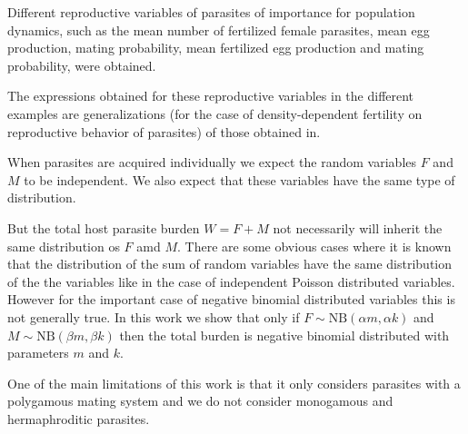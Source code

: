 \documentclass[12pt,a4paper]{article}
\theoremstyle{plain}%
\theoremstyle{definition}
\theoremstyle{remark}
\begin{document}
Different reproductive variables of parasites of importance for population dynamics, such as the mean number of fertilized female parasites, mean egg production, mating probability, mean fertilized egg production and mating probability, were obtained. 
	
The  expressions obtained for these reproductive variables in the different examples are generalizations (for the case of density-dependent fertility on reproductive behavior of parasites) of those obtained in\citep{leyton1968stochastic,may1993biased,may1977togetherness}.



When parasites are acquired individually we expect the random variables $F$ and $M$ to be independent. We also expect that these variables have the same type of distribution. 


But the total host parasite burden $W=F+M$ not necessarily will inherit the same distribution os $F$ amd $M$. There are some obvious cases where it is known that the distribution of the sum of random variables have the same distribution of the the variables like in the case of independent Poisson distributed variables. However for the important case of negative binomial distributed variables this is not generally true. In this work we show that 
only if
$F\sim \mathrm{NB}(\alpha m,\alpha k)$ and $ M\sim \mathrm{NB}(\beta m,\beta k)$ then the total burden is negative binomial distributed with parameters $m$ and $k$. 


	
One of the main limitations of this work is that it only considers parasites with a polygamous mating system and we do not consider monogamous and hermaphroditic parasites.
\end{document}

